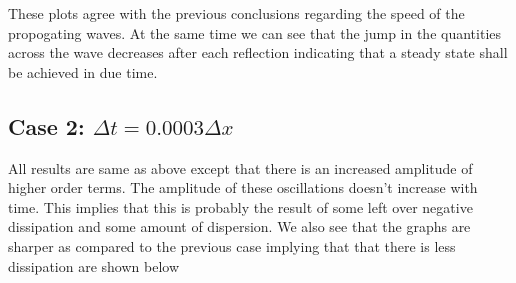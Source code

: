 \documentclass[11pt, a4paper]{article}
\begin{document}
These plots agree with the previous conclusions regarding the speed of the propogating waves. At the same time we can see that 
the jump in the quantities across the wave decreases after each reflection indicating that a steady state shall be achieved in
due time.

\subsection{Case 2: $\Delta t = 0.0003 \Delta x$}

All results are same as above except that there is an increased amplitude of higher order terms. The amplitude of these 
oscillations doesn't increase with time. This implies that this is probably the result of some left over negative dissipation
and some amount of dispersion. We also see that the graphs are sharper as compared to the previous case implying that that
there is less dissipation are shown below
\end{document}
